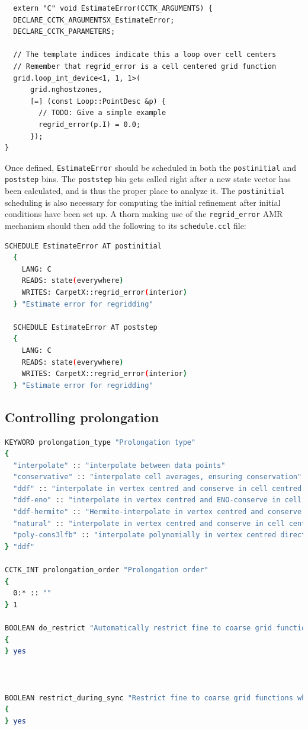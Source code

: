 \begin{lstlisting}
  extern "C" void EstimateError(CCTK_ARGUMENTS) {
  DECLARE_CCTK_ARGUMENTSX_EstimateError;
  DECLARE_CCTK_PARAMETERS;

  // The template indices indicate this a loop over cell centers
  // Remember that regrid_error is a cell centered grid function
  grid.loop_int_device<1, 1, 1>(
      grid.nghostzones,
      [=] (const Loop::PointDesc &p) {
        // TODO: Give a simple example
        regrid_error(p.I) = 0.0;
      });
}
\end{lstlisting}

Once defined, \texttt{EstimateError} should be scheduled in both the \texttt{postinitial} and \texttt{poststep} bins. The \texttt{poststep} bin gets called right after a new state vector has been calculated, and is thus the proper place to analyze it. The \texttt{postinitial} scheduling is also necessary for computing the initial refinement after initial conditions have been set up. A thorn making use of the \texttt{regrid\_error} AMR mechanism should then add the following to its \texttt{schedule.ccl} file:

\begin{lstlisting}[language=bash]
  SCHEDULE EstimateError AT postinitial
  {
    LANG: C
    READS: state(everywhere)
    WRITES: CarpetX::regrid_error(interior)
  } "Estimate error for regridding"
  
  SCHEDULE EstimateError AT poststep
  {
    LANG: C
    READS: state(everywhere)
    WRITES: CarpetX::regrid_error(interior)
  } "Estimate error for regridding"
\end{lstlisting}

\subsection{Controlling prolongation}

\begin{lstlisting}[language=bash]
  KEYWORD prolongation_type "Prolongation type"
{
  "interpolate" :: "interpolate between data points"
  "conservative" :: "interpolate cell averages, ensuring conservation"
  "ddf" :: "interpolate in vertex centred and conserve in cell centred directions"
  "ddf-eno" :: "interpolate in vertex centred and ENO-conserve in cell centred directions"
  "ddf-hermite" :: "Hermite-interpolate in vertex centred and conserve in cell centred directions"
  "natural" :: "interpolate in vertex centred and conserve in cell centred directions, using the same order"
  "poly-cons3lfb" :: "interpolate polynomially in vertex centred directions and conserve with 3rd order accuracy and a linear fallback in cell centred directions"
} "ddf"

CCTK_INT prolongation_order "Prolongation order"
{
  0:* :: ""
} 1

BOOLEAN do_restrict "Automatically restrict fine to coarse grid functions"
{
} yes



BOOLEAN restrict_during_sync "Restrict fine to coarse grid functions when syncing"
{
} yes
\end{lstlisting}